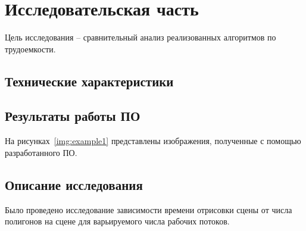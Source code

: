\chapter{Исследовательская часть}

Цель исследования -- сравнительный анализ реализованных алгоритмов по трудоемкости.


\section{Технические характеристики}
%	

\section{Результаты работы ПО}
На рисунках~\ref{img:example1} представлены изображения, полученные с помощью разработанного ПО.


\section{Описание исследования}
Было проведено исследование зависимости времени отрисовки сцены от числа полигонов на сцене для варьируемого числа рабочих потоков. 



